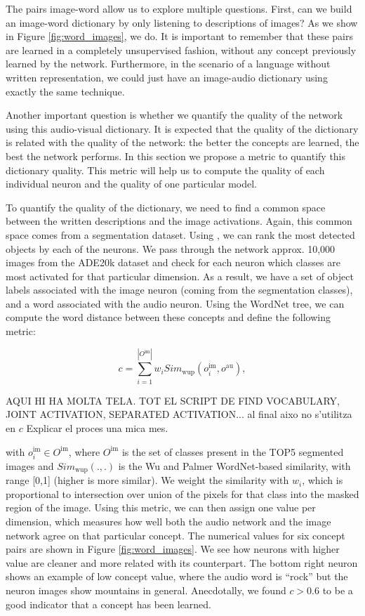 The pairs image-word allow us to explore multiple questions. First, can we build an image-word dictionary by only listening to descriptions of images? As we show in Figure \ref{fig:word_images}, we do. It is important to remember that these pairs are learned in a completely unsupervised fashion, without any concept previously learned by the network. Furthermore, in the scenario of a language without written representation, we could just have an image-audio dictionary using exactly the same technique.

Another important question is whether we quantify the quality of the network using this audio-visual dictionary. It is expected that the quality of the dictionary is related with the quality of the network: the better the concepts are learned, the best the network performs. In this section we propose a metric to quantify this dictionary quality. This metric will help us to compute the quality of each individual neuron and the quality of one particular model. 

To quantify the quality of the dictionary, we need to find a common space between the written descriptions and the image activations. Again, this common space comes from a segmentation dataset. Using \cite{ade20k}, we can rank the most detected objects by each of the neurons. We pass through the network approx. 10,000 images from the ADE20k dataset and check for each neuron which classes are most activated for that particular dimension. As a result, we have a set of object labels associated with the image neuron (coming from the segmentation classes), and a word associated with the audio neuron. Using the WordNet tree, we can compute the word distance between these concepts and define the following metric:

\begin{equation}
c = \sum_{i=1}^{|O^{\text{im}}|}{w_i{Sim}_{\text{wup}}(o_i^{\text{im}},o^{\text{au}})},
\end{equation}

AQUI HI HA MOLTA TELA. TOT EL SCRIPT DE FIND VOCABULARY, JOINT ACTIVATION, SEPARATED ACTIVATION... al final aixo no s'utilitza en $c$ Explicar el proces una mica mes. 

with $o_i^{\text{im}}\in O^{\text{im}}$, where $O^{\text{im}}$ is the set of classes present in the TOP5 segmented images and ${Sim}_{\text{wup}}(.,.)$ is the Wu and Palmer WordNet-based similarity, with range [0,1] (higher is more similar). We weight the similarity with $w_i$, which is proportional to intersection over union of the pixels for that class into the masked region of the image. Using this metric, we can then assign one value per dimension, which measures how well both the audio network and the image network agree on that particular concept. The numerical values for six concept pairs are shown in Figure \ref{fig:word_images}. We see how neurons with higher value are cleaner and more related with its counterpart. The bottom right neuron shows an example of low concept value, where the audio word is ``rock'' but the neuron images show mountains in general. Anecdotally, we found $c>0.6$ to be a good indicator that a concept has been learned.

